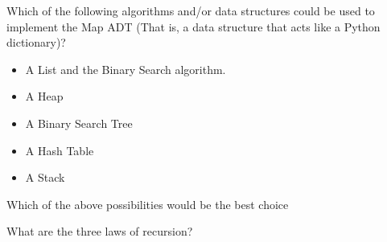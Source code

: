 \documentclass[11pt]{exam}
\begin{document}
\begin{questions}

\question[5] Which of the following algorithms and/or data structures could be used to implement the Map ADT (That is, a data structure that acts like a Python dictionary)?
\begin{itemize}
\item A List and the Binary Search algorithm.
\item A Heap
\item A Binary Search Tree
\item A Hash Table
\item A Stack
\end{itemize}

\question[2] Which of the above possibilities would be the best choice
\vspace{1in}

\question[3] What are the three laws of recursion?
\vspace{1in}






\end{questions}
\end{document}
